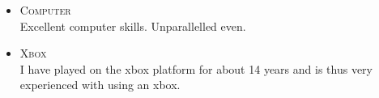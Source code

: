 





\begin{itemize}[leftmargin=7mm, itemsep=2mm, parsep=0mm]
	\item[\lline{olofblue}] {\fontsize{11}{0}\textsc{Computer}}
	\\		
	{\small Excellent computer skills. Unparallelled even.} 


	\item[\lline{olofblue}] {\fontsize{11}{0}\textsc{Xbox}}
	\\
	{\small I have played on the xbox platform for about 14 years and is thus very experienced with using an xbox.} 
\end{itemize}



